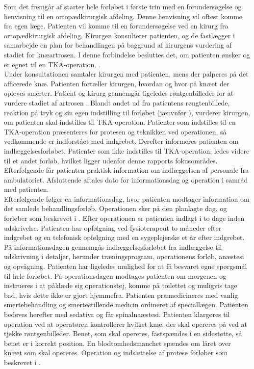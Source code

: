 Som det fremgår af  starter hele forløbet i første trin med en forundersøgelse og henvisning til en ortopædkirurgisk afdeling. Denne henvisning vil oftest komme fra egen læge. Patienten vil komme til en forundersøgelse ved en kirurg fra ortopædkirurgisk afdeling. Kirurgen konsulterer patienten, og de fastlægger i samarbejde en plan for behandlingen på baggrund af kirurgens vurdering af stadiet for knæartrosen. I denne forbindelse besluttes det, om patienten ønsker og er egnet til en TKA-operation. \citep{pritka2015}. \\
Under konsultationen samtaler kirurgen med patienten, mens der palperes på det afficerede knæ. Patienten fortæller kirurgen, hvordan og hvor på knæet der opleves smerter. Patient og kirurg gennemgår ligeledes røntgenbilleder for at vurdere stadiet af artrosen \citep{pritka2015}.
Blandt andet ud fra patientens røngtenbillede, reaktion på tryk og sin egen indstilling til forløbet (jænvnfør ), vurderer kirurgen, om patienten skal indstilles til TKA-operation. Patienter som indstilles til en TKA-operation præsenteres for protesen og teknikken ved operationen, så vedkommende er indforstået med indgrebet. Derefter informeres patienten om indlæggelsesforløbet. Patienter som ikke indstilles til TKA-operation, ledes videre til et andet forløb, hvilket ligger udenfor denne rapports fokusområdes.
Efterfølgende får patienten praktisk information om indlæggelsen af personale fra ambulatoriet. Afsluttende aftales dato for informationsdag og operation i samråd med patienten. \citep{pritka2015} \\
Efterfølgende følger en informationsdag, hvor patienten modtager information om det samlede behandlingsforløb. Operationen sker på den planlagte dag, og forløber som beskrevet i . Efter operationen er patienten indlagt i to dage inden udskrivelse. Patienten har opfølgning ved fysioterapeut to måneder efter indgrebet og en telefonisk opfølgning med en sygeplejerske et år efter indgrebet. \citep{pritka2015} \\
På informationsdagen gennemgås indlæggelsesforløbet fra indlæggelse til udskrivning i detaljer, herunder træningsprogram,  operationens forløb, anæstesi og opvågning. Patienten har ligeledes mulighed for at få besvaret egne spørgsmål til hele forløbet. 
På operationsdagen modtages patienten om morgenen og instrueres i at påklæde sig operationstøj, komme på toilettet og muligvis tage bad, hvis dette ikke er gjort hjemmefra. Patienten præmedicineres med vanlig smertebehandling og smertestillende medicin ordineret af speciallægen. Patienten bedøves herefter med sedativa og får spinalnaæstesi. Patienten klargøres til operation ved at operatøren kontrollerer hvilket knæ, der skal opereres på ved at tjekke røntgenbilleder. Benet, som skal opereres, fastspændes i en sidestøtte, så benet er i korrekt position. En blodtomhedsmanchet spændes om låret over knæet som skal opereres. Operation og indsættelse af protese forløber som beskrevet i . \citep{pritka2015} \\
